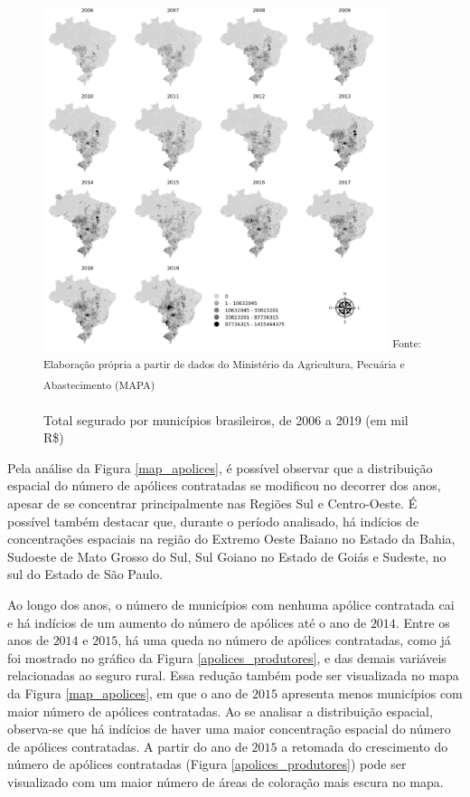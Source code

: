 \begin{figure}[H]
	\centering
	\caption{Total segurado por municípios brasileiros, de 2006 a 2019 (em mil R\$)}
	\includegraphics[width=0.9\textwidth]{figuras/map_total_segurado_mil.png}
	\small \textsuperscript {Fonte: Elaboração própria a partir de dados do Ministério da Agricultura, Pecuária e Abastecimento (MAPA)}
    \label{map_lisa_segurado}
\end{figure}

Pela análise da Figura \ref{map_apolices}, é possível observar que a distribuição espacial do número de apólices contratadas se modificou no decorrer dos anos, apesar de se concentrar principalmente nas Regiões Sul e Centro-Oeste. É possível também destacar que, durante o período analisado, há indícios de concentrações espaciais na região do Extremo Oeste Baiano no Estado da Bahia, Sudoeste de Mato Grosso do Sul, Sul Goiano no Estado de Goiás e Sudeste, no sul do Estado de São Paulo.

Ao longo dos anos, o número de municípios com nenhuma apólice contratada cai e há indícios de um aumento do número de apólices até o ano de $2014$. Entre os anos de $2014$ e $2015$,     há uma queda no número de apólices contratadas, como já foi mostrado no gráfico da Figura \ref{apolices_produtores}, e das demais variáveis relacionadas ao seguro rural. Essa redução também pode ser visualizada no mapa da Figura \ref{map_apolices}, em que o ano de $2015$ apresenta menos municípios com maior número de apólices contratadas. Ao se analisar a distribuição espacial, observa-se que há indícios de haver uma maior concentração espacial do número de apólices contratadas. A partir do ano de $2015$ a retomada do crescimento do número de apólices contratadas (Figura \ref{apolices_produtores}) pode ser visualizado com um maior número de áreas de coloração mais escura no mapa.

